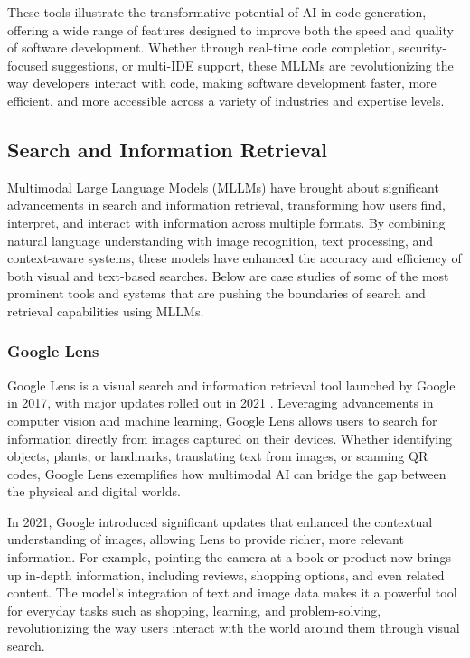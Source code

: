 These tools illustrate the transformative potential of AI in code generation, offering a wide range of features designed to improve both the speed and quality of software development. Whether through real-time code completion, security-focused suggestions, or multi-IDE support, these MLLMs are revolutionizing the way developers interact with code, making software development faster, more efficient, and more accessible across a variety of industries and expertise levels.

\subsection{Search and Information Retrieval}

Multimodal Large Language Models (MLLMs) have brought about significant advancements in search and information retrieval, transforming how users find, interpret, and interact with information across multiple formats. 
By combining natural language understanding with image recognition, text processing, and context-aware systems, these models have enhanced the accuracy and efficiency of both visual and text-based searches. 
Below are case studies of some of the most prominent tools and systems that are pushing the boundaries of search and retrieval capabilities using MLLMs.

\subsubsection{Google Lens}

Google Lens is a visual search and information retrieval tool launched by Google in 2017, with major updates rolled out in 2021 \cite{GoogleLens}. 
Leveraging advancements in computer vision and machine learning, Google Lens allows users to search for information directly from images captured on their devices. 
Whether identifying objects, plants, or landmarks, translating text from images, or scanning QR codes, Google Lens exemplifies how multimodal AI can bridge the gap between the physical and digital worlds.

In 2021, Google introduced significant updates that enhanced the contextual understanding of images, allowing Lens to provide richer, more relevant information. 
For example, pointing the camera at a book or product now brings up in-depth information, including reviews, shopping options, and even related content. 
The model's integration of text and image data makes it a powerful tool for everyday tasks such as shopping, learning, and problem-solving, revolutionizing the way users interact with the world around them through visual search.

